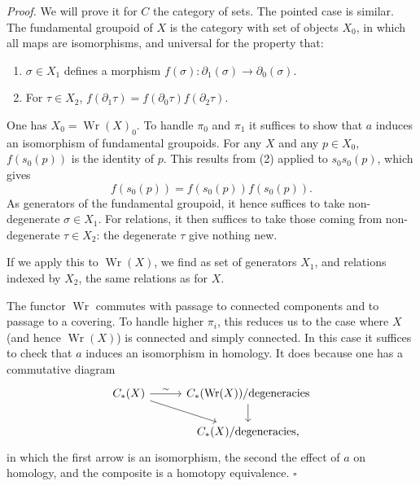 \documentclass[11pt]{article}
\theoremstyle{deligne}
\newenvironment{proofdel}{\noindent\textit{Proof.}}{\hfill$\square$}
\newcommand{\Wr}{\operatorname{Wr}}
\begin{document}
\begin{proofdel}
We will prove it for \(C\) the category of sets. The pointed case is similar. The fundamental groupoid of \(X\) is the category with set of objects \(X_0\), in which all maps are isomorphisms, and universal for the property that:
\begin{enumerate}[label=(\arabic*)]
\item \(\sigma\in X_1\) defines a morphism \(f(\sigma):\partial_1(\sigma)\to\partial_0(\sigma)\).
\item For \(\tau\in X_2\), \(f(\partial_1\tau)=f(\partial_0\tau)f(\partial_2\tau)\).
\end{enumerate}
One has \(X_0=\Wr(X)_0\). To handle \(\pi_0\) and \(\pi_1\) it suffices to show that \(a\) induces an isomorphism of fundamental groupoids. For any \(X\) and any \(p\in X_0\), \(f(s_0(p))\) is the identity of \(p\). This results from (2) applied to \(s_0s_0(p)\), which gives
\[
f(s_0(p))=f(s_0(p))f(s_0(p)).
\]
As generators of the fundamental groupoid, it hence suffices to take non-degenerate \(\sigma\in X_1\). For relations, it then suffices to take those coming from non-degenerate \(\tau\in X_2\): the degenerate \(\tau\) give nothing new.

If we apply this to \(\Wr(X)\), we find as set of generators \(X_1\), and relations indexed by \(X_2\), the same relations as for \(X\).

The functor \(\Wr\) commutes with passage to connected components and to passage to a covering. To handle higher \(\pi_i\), this reduces us to the case where \(X\) (and hence \(\Wr(X)\)) is connected and simply connected. In this case it suffices to check that \(a\) induces an isomorphism in homology. It does because one has a commutative diagram
\[
\begin{tikzcd}[column sep=2.8em,row sep=1.6em]
C_*(X) \arrow[r,"\sim"] \arrow[dr] & C_*(\Wr(X))/\text{degeneracies} \arrow[d] \\
& C_*(X)/\text{degeneracies},
\end{tikzcd}
\]
in which the first arrow is an isomorphism, the second the effect of \(a\) on homology, and the composite is a homotopy equivalence.
\end{proofdel}
\end{document}
